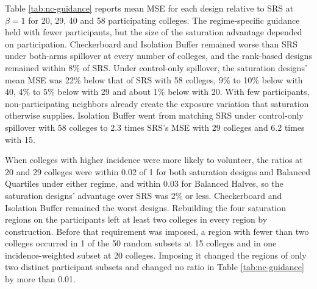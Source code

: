 \documentclass[11pt]{article}
\begin{document}
Table \ref{tab:nc-guidance} reports mean MSE for each design relative to SRS at $\beta = 1$ for 20, 29, 40 and 58 participating colleges. The regime-specific guidance held with fewer participants, but the size of the saturation advantage depended on participation. Checkerboard and Isolation Buffer remained worse than SRS under both-arms spillover at every number of colleges, and the rank-based designs remained within 8\% of SRS. Under control-only spillover, the saturation designs' mean MSE was 22\% below that of SRS with 58 colleges, 9\% to 10\% below with 40, 4\% to 5\% below with 29 and about 1\% below with 20. With few participants, non-participating neighbors already create the exposure variation that saturation otherwise supplies. Isolation Buffer went from matching SRS under control-only spillover with 58 colleges to 2.3 times SRS's MSE with 29 colleges and 6.2 times with 15.

When colleges with higher incidence were more likely to volunteer, the ratios at 20 and 29 colleges were within 0.02 of 1 for both saturation designs and Balanced Quartiles under either regime, and within 0.03 for Balanced Halves, so the saturation designs' advantage over SRS was 2\% or less. Checkerboard and Isolation Buffer remained the worst designs. Rebuilding the four saturation regions on the participants left at least two colleges in every region by construction. Before that requirement was imposed, a region with fewer than two colleges occurred in 1 of the 50 random subsets at 15 colleges and in one incidence-weighted subset at 20 colleges. Imposing it changed the regions of only two distinct participant subsets and changed no ratio in Table \ref{tab:nc-guidance} by more than 0.01.
\end{document}
